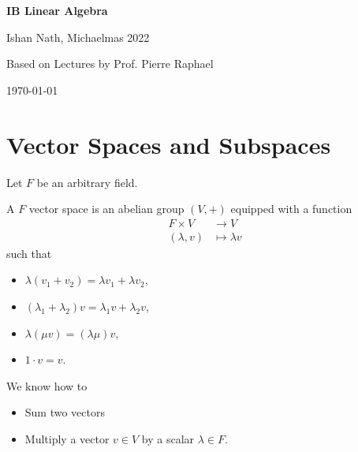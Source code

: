 \documentclass[12pt]{article}
\begin{document}
\hypersetup{pageanchor=false}
\begin{titlepage}
	\begin{center}
		\vspace*{1em}
		\Huge
		\textbf{IB Linear Algebra}

		\vspace{1em}
		\large
		Ishan Nath, Michaelmas 2022

		\vspace{1.5em}

		\Large

		Based on Lectures by Prof. Pierre Raphael

		\vspace{1em}

		\large
		\today
	\end{center}
	
\end{titlepage}
\hypersetup{pageanchor=true}

\tableofcontents

\newpage

\section{Vector Spaces and Subspaces}%
\label{sec:vector_spaces_and_subspaces}

Let $F$ be an arbitrary field.

\begin{definition}
	A $F$ vector space is an abelian group $(V, +)$ equipped with a function
	\begin{align*}
		F \times V &\to V \\
		(\lambda, v) &\mapsto \lambda v
	\end{align*}
	such that
	\begin{itemize}
		\item $\lambda(v_1 + v_2) = \lambda v_1 + \lambda v_2$, 
		\item $(\lambda_1 + \lambda_2)v = \lambda_1 v + \lambda_2 v$,
		\item $\lambda(\mu v) = (\lambda \mu) v$,
		\item $1 \cdot v = v$.
	\end{itemize}
\end{definition}
We know how to
\begin{itemize}
	\item Sum two vectors
	\item Multiply a vector $v \in V$ by a scalar $\lambda \in F$.
\end{itemize}
\end{document}
